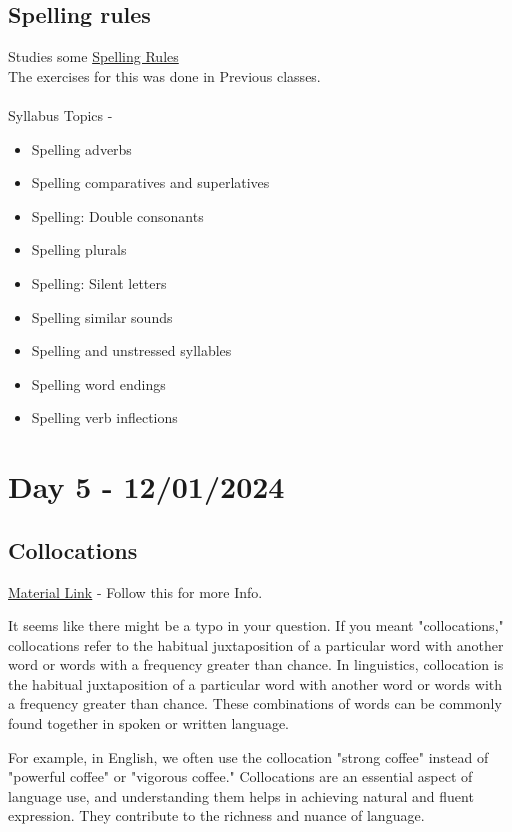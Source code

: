 \documentclass[a4paper,30pt]{report}
\begin{document}
    \section{Spelling rules}
      Studies some \href{https://www.awelu.lu.se/language/spelling/english-spelling-rules/?authuser=1}{Spelling Rules}\\
      The exercises for this was done in Previous classes. \\\\
      Syllabus Topics - 
      \begin{itemize}
        \item Spelling adverbs
        \item Spelling comparatives and superlatives
        \item Spelling: Double consonants
        \item Spelling plurals
        \item Spelling: Silent letters
        \item Spelling similar sounds
        \item Spelling and unstressed syllables
        \item Spelling word endings
        \item Spelling verb inflections
      \end{itemize}
      
  \chapter{Day 5 - 12/01/2024}
    \section{Collocations}
      \href{https://www.englishclub.com/vocabulary/collocations.php}{Material Link} - Follow this for more Info.
      \par It seems like there might be a typo in your question. If you meant "collocations," collocations refer to the habitual juxtaposition of a particular word with another word or words with a frequency greater than chance. In linguistics, collocation is the habitual juxtaposition of a particular word with another word or words with a frequency greater than chance. These combinations of words can be commonly found together in spoken or written language.
      \par For example, in English, we often use the collocation "strong coffee" instead of "powerful coffee" or "vigorous coffee." Collocations are an essential aspect of language use, and understanding them helps in achieving natural and fluent expression. They contribute to the richness and nuance of language.\\\\
      
\end{document}
